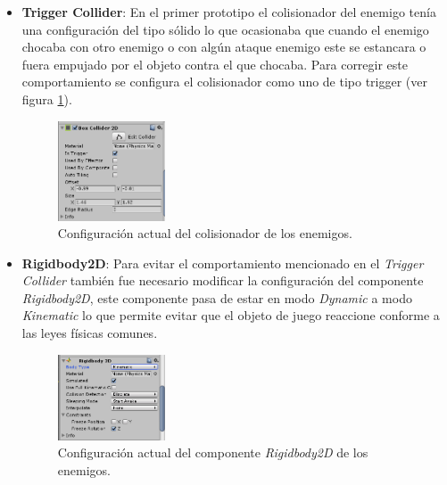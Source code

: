 \begin{itemize}
         \item \textbf{Trigger Collider}: En el primer prototipo el colisionador del
         enemigo tenía una configuración del tipo sólido lo que ocasionaba que cuando
         el enemigo chocaba con otro enemigo o con algún ataque enemigo este se
         estancara o fuera empujado por el objeto contra el que chocaba.
         Para corregir este comportamiento se configura el colisionador como uno de tipo
         trigger (ver figura \ref{fig:EnemyColliderTri}).  
            
            \begin{figure}[h]
                \centering
                \includegraphics[width=0.3\textwidth]{03TrabajoRealizado/imagenes/Colisonador01.png}
                \caption{Configuración actual del colisionador de los enemigos.}
                \label{fig:EnemyColliderTri}
            \end{figure}    
        
         \item \textbf{Rigidbody2D}: Para evitar el comportamiento mencionado en el
         \textit{Trigger Collider} también fue necesario modificar la configuración
         del componente \textit{Rigidbody2D}, este componente pasa de estar en modo
         \textit{Dynamic} a modo \textit{Kinematic} lo que permite evitar que el objeto
         de juego reaccione conforme a las leyes físicas comunes.   
             
             \begin{figure}[h]
                \centering
                \includegraphics[width=0.3\textwidth]{03TrabajoRealizado/imagenes/Colisonador02.png}
                \caption{Configuración actual del componente \textit{Rigidbody2D} de
                los enemigos.}
                \label{fig:EnemyRigidBody}
            \end{figure}
    \end{itemize}

